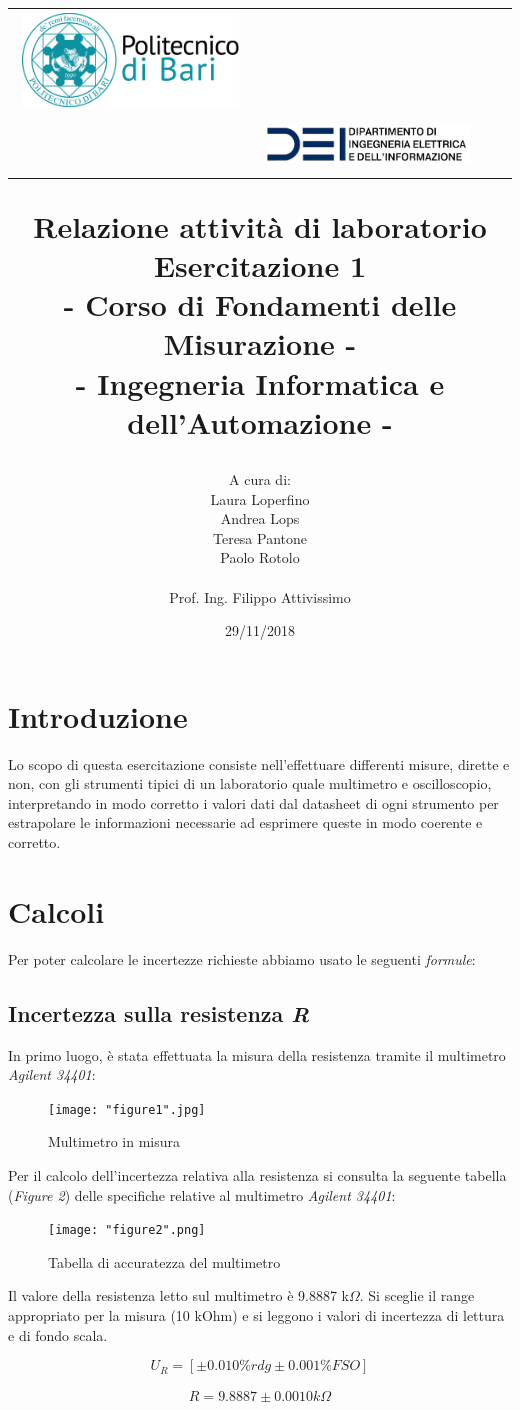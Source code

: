 \documentclass[a4paper]{article}
\title{\begin{center}
		\setlength{\tabcolsep}{0pt}
		\begin{tabular}{>{\raggedleft}m{3cm}>{\centering}m{\textwidth - 5cm\relax}>{\raggedright}m{3cm}}
			\includegraphics[width=\linewidth]{poliba.png}%
			&%
			\textbf{ } \\[5pt]%
			\textbf{\ }%
			&%
			\includegraphics[width=\linewidth]{dei.png} %
		\end{tabular}
	\end{center}
	\textbf{Relazione attività di laboratorio\\}
	\textbf{\large Esercitazione 1\\- Corso di Fondamenti delle Misurazione -\\ }
	{\normalsize 
		- Ingegneria Informatica e dell'Automazione -
}}
\author{A cura di:\\
	Laura Loperfino\\
	Andrea Lops \\
	Teresa Pantone\\
	Paolo Rotolo\\
	\\
	Prof. Ing. Filippo Attivissimo
}
\date{29/11/2018}
\begin{document}
\maketitle

\section{Introduzione}

Lo scopo di questa esercitazione consiste nell'effettuare differenti misure, dirette e non, con gli strumenti tipici di un laboratorio quale multimetro e oscilloscopio,  interpretando in modo corretto i valori dati dal datasheet di ogni strumento per estrapolare le informazioni necessarie ad esprimere queste in modo coerente e corretto.

\section{Calcoli}

Per poter calcolare le incertezze richieste abbiamo usato le seguenti \emph{formule}:\\
\subsection {Incertezza sulla resistenza \emph{R}}

In primo luogo, è stata effettuata la misura della resistenza tramite il multimetro \emph{Agilent 34401}:

\begin{figure}[htp]
	\centering
	\texttt{[image: "figure1".jpg]}
	\caption{Multimetro in misura}
	\label{}
\end{figure}
\noindent 
Per il calcolo dell'incertezza relativa alla resistenza si consulta la seguente tabella (\emph{Figure 2}) delle specifiche relative al multimetro \emph{Agilent 34401}:
\begin{center}
	\begin{figure}[htp]
		\centering
		\texttt{[image: "figure2".png]}
		\caption{Tabella di accuratezza del multimetro}
		\label{a}
	\end{figure}
\end{center}

Il valore della resistenza letto sul multimetro è  9.8887 k$\Omega$. Si sceglie il range appropriato per la misura (10 kOhm) e si leggono i valori di incertezza di lettura e di fondo scala.

\begin{Large} 
	\begin{equation} 
		U_{R} = [\pm 0.010\%rdg \pm 0.001\% FSO]
	 \end{equation}
	 
	 \begin{eqnarray*} 
	 	R = 9.8887 \pm 0.0010 k\Omega 
	 \end{eqnarray*}
\end{Large}
\end{document}
